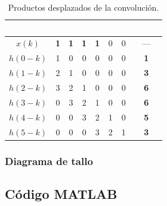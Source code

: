 \documentclass[../Main_Include.tex]{subfiles}
\begin{document}
\begin{table}[H]
\centering
\renewcommand{\arraystretch}{1.4}
\begin{tabular}{cccccccc}
\toprule
\rowcolor{azulprinc}
\textcolor{white}{\textbf{$k$}} &
\textcolor{white}{\textbf{0}} &
\textcolor{white}{\textbf{1}} &
\textcolor{white}{\textbf{2}} &
\textcolor{white}{\textbf{3}} &
\textcolor{white}{\textbf{4}} &
\textcolor{white}{\textbf{5}} &
\textcolor{white}{\textbf{$y(n)$}} \\
\midrule
\rowcolor{grisclaro}
$x(k)$    & \textbf{1} & \textbf{1} & \textbf{1} & \textbf{1} & 0 & 0 & --- \\
$h(0-k)$  & 1 & 0 & 0 & 0 & 0 & 0 & \textbf{1} \\
\rowcolor{grisclaro}
$h(1-k)$  & 2 & 1 & 0 & 0 & 0 & 0 & \textbf{3} \\
$h(2-k)$  & 3 & 2 & 1 & 0 & 0 & 0 & \textbf{6} \\
\rowcolor{grisclaro}
$h(3-k)$  & 0 & 3 & 2 & 1 & 0 & 0 & \textbf{6} \\
$h(4-k)$  & 0 & 0 & 3 & 2 & 1 & 0 & \textbf{5} \\
\rowcolor{grisclaro}
$h(5-k)$  & 0 & 0 & 0 & 3 & 2 & 1 & \textbf{3} \\
\bottomrule
\end{tabular}
\caption{Productos desplazados de la convolución.}
\end{table}

\subsubsection*{Diagrama de tallo}

\subsection*{Código MATLAB}
\end{document}
